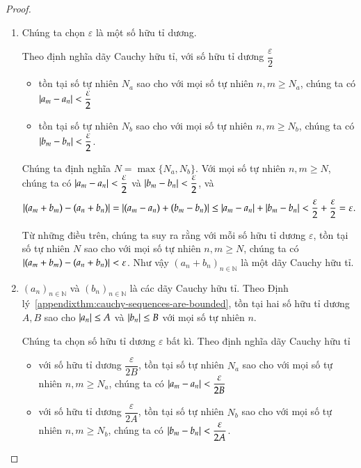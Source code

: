 \begin{proof}
    \begin{enumerate}[label={(\roman*)}]
        \item Chúng ta chọn $\varepsilon$ là một số hữu tỉ dương.

              Theo định nghĩa dãy Cauchy hữu tỉ, với số hữu tỉ dương $\dfrac{\varepsilon}{2}$
              \begin{itemize}
                  \item tồn tại số tự nhiên $N_{a}$ sao cho với mọi số tự nhiên $n, m\geq N_{a}$, chúng ta có $\left\vert{a_{m} - a_{n}}\right\vert < \dfrac{\varepsilon}{2}$
                  \item tồn tại số tự nhiên $N_{b}$ sao cho với mọi số tự nhiên $n, m\geq N_{b}$, chúng ta có $\left\vert{b_{m} - b_{n}}\right\vert < \dfrac{\varepsilon}{2}$.
              \end{itemize}

              Chúng ta định nghĩa $N = \max\{ N_{a}, N_{b} \}$. Với mọi số tự nhiên $n, m\geq N$, chúng ta có $\left\vert{a_{m} - a_{n}}\right\vert < \dfrac{\varepsilon}{2}$ và $\left\vert{b_{m} - b_{n}}\right\vert < \dfrac{\varepsilon}{2}$, và
              \[
                  \left\vert{(a_{m} + b_{m}) - (a_{n} + b_{n})}\right\vert = \left\vert{(a_{m} - a_{n}) + (b_{m} - b_{n})}\right\vert \leq \left\vert{a_{m} - a_{n}}\right\vert + \left\vert{b_{m} - b_{n}}\right\vert < \frac{\varepsilon}{2} + \frac{\varepsilon}{2} = \varepsilon.
              \]

              Từ những điều trên, chúng ta suy ra rằng với mỗi số hữu tỉ dương $\varepsilon$, tồn tại số tự nhiên $N$ sao cho với mọi số tự nhiên $n, m\geq N$, chúng ta có $\left\vert{(a_{m} + b_{m}) - (a_{n} + b_{n})}\right\vert < \varepsilon$. Như vậy ${(a_{n} + b_{n})}_{n\in\mathbb{N}}$ là một dãy Cauchy hữu tỉ.
        \item ${(a_{n})}_{n\in\mathbb{N}}$ và ${(b_{n})}_{n\in\mathbb{N}}$ là các dãy Cauchy hữu tỉ. Theo Định lý~\ref{appendixthm:cauchy-sequences-are-bounded}, tồn tại hai số hữu tỉ dương $A, B$ sao cho $\left\vert{a_{n}}\right\vert\leq A$ và $\left\vert{b_{n}}\right\vert\leq B$ với mọi số tự nhiên $n$.

              Chúng ta chọn số hữu tỉ dương $\varepsilon$ bất kì. Theo định nghĩa dãy Cauchy hữu tỉ
              \begin{itemize}
                  \item với số hữu tỉ dương $\dfrac{\varepsilon}{2B}$, tồn tại số tự nhiên $N_{a}$ sao cho với mọi số tự nhiên $n, m\geq N_{a}$, chúng ta có $\left\vert{a_{m} - a_{n}}\right\vert < \dfrac{\varepsilon}{2B}$
                  \item với số hữu tỉ dương $\dfrac{\varepsilon}{2A}$, tồn tại số tự nhiên $N_{b}$ sao cho với mọi số tự nhiên $n, m\geq N_{b}$, chúng ta có $\left\vert{b_{m} - b_{n}}\right\vert < \dfrac{\varepsilon}{2A}$.
              \end{itemize}


\end{enumerate}
\end{proof}
